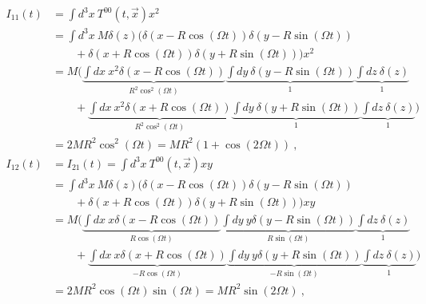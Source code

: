 \documentclass[a4paper]{article}
\begin{document}
    \begin{equation*}
    \begin{aligned}
        I_{11} (t) & = \int d^3 x ~ T^{00} (t, \vec x) x^2 \\ & = \int d^3 x ~ M \delta (z) \Big (\delta(x - R \cos (\Omega t))\delta(y - R \sin (\Omega t)) \\ & \qquad + \delta(x + R \cos (\Omega t))\delta(y + R \sin (\Omega t)) \Big ) x^2 \\ & = M \Big ( \underbrace{\int dx ~ x^2 \delta (x - R \cos (\Omega t))}_{R^2 \cos^2 (\Omega t)} \underbrace{\int dy ~ \delta (y - R \sin (\Omega t))}_1 \underbrace{\int d z ~ \delta (z)}_1 \\ & \qquad + \underbrace{\int dx ~ x^2 \delta (x + R \cos (\Omega t))}_{R^2 \cos^2(\Omega t)}\underbrace{\int dy ~ \delta (y + R \sin (\Omega t))}_1 \underbrace{\int d z ~ \delta (z)}_1 \Big ) \\ & = 2 M R^2 \cos^2 (\Omega t) = M R^2 (1 + \cos (2 \Omega t)) ~,
    \end{aligned}
    \end{equation*}
    \begin{equation*}
    \begin{aligned}
        I_{12} (t) & = I_{21} (t) = \int d^3 x ~ T^{00} (t, \vec x) xy \\ & = \int d^3 x ~ M \delta (z) \Big (\delta(x - R \cos (\Omega t))\delta(y - R \sin (\Omega t)) \\ & \qquad + \delta(x + R \cos (\Omega t))\delta(y + R \sin (\Omega t)) \Big ) x y \\ & = M \Big ( \underbrace{\int dx ~ x \delta (x - R \cos (\Omega t))}_{R \cos (\Omega t)} \underbrace{\int dy ~ y \delta (y - R \sin (\Omega t))}_{R \sin (\Omega t)} \underbrace{\int d z ~ \delta (z)}_1 \\ & \qquad + \underbrace{\int dx ~ x \delta (x + R \cos (\Omega t))}_{- R \cos(\Omega t)}\underbrace{\int dy ~ y \delta (y + R \sin (\Omega t))}_{- R \sin (\Omega t)} \underbrace{\int d z ~ \delta (z)}_1 \Big ) \\ & = 2 M R^2 \cos (\Omega t) \sin (\Omega t) = M R^2 \sin (2 \Omega t) ~,
    \end{aligned}
    \end{equation*}
\end{document}
